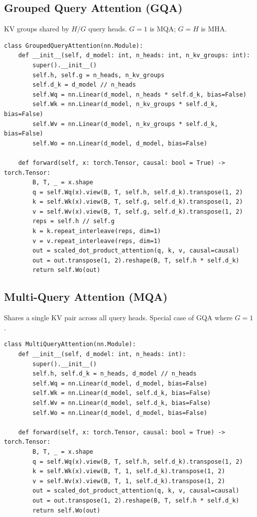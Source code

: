 \subsection{Grouped Query Attention (GQA)}
\label{form:gqa}

KV groups shared by $H/G$ query heads. $G=1$ is MQA; $G=H$ is MHA.

\begin{lstlisting}[style=pythonstyle, caption={Grouped query attention}, label=lst:gqa]
class GroupedQueryAttention(nn.Module):
    def __init__(self, d_model: int, n_heads: int, n_kv_groups: int):
        super().__init__()
        self.h, self.g = n_heads, n_kv_groups
        self.d_k = d_model // n_heads
        self.Wq = nn.Linear(d_model, n_heads * self.d_k, bias=False)
        self.Wk = nn.Linear(d_model, n_kv_groups * self.d_k, bias=False)
        self.Wv = nn.Linear(d_model, n_kv_groups * self.d_k, bias=False)
        self.Wo = nn.Linear(d_model, d_model, bias=False)

    def forward(self, x: torch.Tensor, causal: bool = True) -> torch.Tensor:
        B, T, _ = x.shape
        q = self.Wq(x).view(B, T, self.h, self.d_k).transpose(1, 2)
        k = self.Wk(x).view(B, T, self.g, self.d_k).transpose(1, 2)
        v = self.Wv(x).view(B, T, self.g, self.d_k).transpose(1, 2)
        reps = self.h // self.g
        k = k.repeat_interleave(reps, dim=1)
        v = v.repeat_interleave(reps, dim=1)
        out = scaled_dot_product_attention(q, k, v, causal=causal)
        out = out.transpose(1, 2).reshape(B, T, self.h * self.d_k)
        return self.Wo(out)
\end{lstlisting}

\subsection{Multi-Query Attention (MQA)}
\label{form:mqa}

Shares a single KV pair across all query heads. Special case of GQA where $G=1$.

\begin{lstlisting}[style=pythonstyle, caption={Multi-query attention}, label=lst:mqa]
class MultiQueryAttention(nn.Module):
    def __init__(self, d_model: int, n_heads: int):
        super().__init__()
        self.h, self.d_k = n_heads, d_model // n_heads
        self.Wq = nn.Linear(d_model, d_model, bias=False)
        self.Wk = nn.Linear(d_model, self.d_k, bias=False)
        self.Wv = nn.Linear(d_model, self.d_k, bias=False)
        self.Wo = nn.Linear(d_model, d_model, bias=False)

    def forward(self, x: torch.Tensor, causal: bool = True) -> torch.Tensor:
        B, T, _ = x.shape
        q = self.Wq(x).view(B, T, self.h, self.d_k).transpose(1, 2)
        k = self.Wk(x).view(B, T, 1, self.d_k).transpose(1, 2)
        v = self.Wv(x).view(B, T, 1, self.d_k).transpose(1, 2)
        out = scaled_dot_product_attention(q, k, v, causal=causal)
        out = out.transpose(1, 2).reshape(B, T, self.h * self.d_k)
        return self.Wo(out)
\end{lstlisting}

